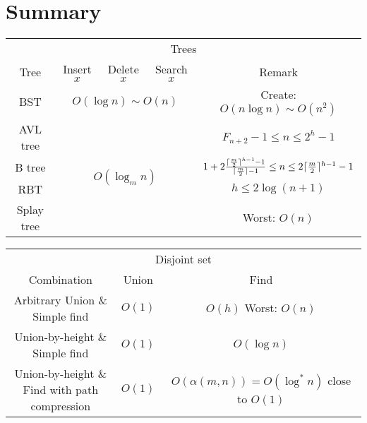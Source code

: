 \section{Summary}

\begin{table}[H]
    \centering
    \begin{tabular}{|c|c|c|c|c|}
        \hline
        \multicolumn{5}{|c|}{Trees} \\
        \Xhline{3\arrayrulewidth}
        Tree & Insert $x$ & Delete $x$ & Search $x$ & Remark \\
        \Xhline{2\arrayrulewidth}
        BST & \multicolumn{3}{c|}{$O(\log n) \sim O(n)$} & Create: $O(n\log n) \sim O(n^2)$ \\
        \hline
        AVL tree & \multicolumn{3}{c|}{\multirow{4}{*}{$O(\log_m n)$}} & $F_{n + 2} - 1 \le n \le 2^h - 1$ \\
        \cline{1-1}\cline{5-5}
        B tree & \multicolumn{3}{c|}{} & $1 + 2\frac{\lceil\frac{m}{2}\rceil^{h - 1} - 1}{\lceil\frac{m}{2}\rceil - 1} \le n \le 2\lceil\frac{m}{2}\rceil^{h - 1} - 1$ \\
        \cline{1-1}\cline{5-5}
        RBT & \multicolumn{3}{c|}{} & $h \le 2\log (n + 1)$ \\
        \cline{1-1}\cline{5-5}
        Splay tree & \multicolumn{3}{c|}{} & Worst: $O(n)$ \\
        \hline
    \end{tabular}
\end{table}

\begin{table}[H]
    \centering
    \begin{tabular}{|c|c|c|}
        \hline
        \multicolumn{3}{|c|}{Disjoint set} \\
        \Xhline{3\arrayrulewidth}
        Combination & Union & Find \\
        \Xhline{2\arrayrulewidth}
        \makecell{Arbitrary Union \&\\Simple find} & $O(1)$ & \makecell{$O(h)$\\Worst: $O(n)$} \\
        \hline
        \makecell{Union-by-height \&\\Simple find} & $O(1)$ & $O(\log n)$ \\
        \hline
        \makecell{Union-by-height \&\\Find with path compression} & $O(1)$ & \makecell{$O(\alpha(m, n)) = O(\log^* n)$\\close to $O(1)$} \\
        \hline
    \end{tabular}
\end{table}


